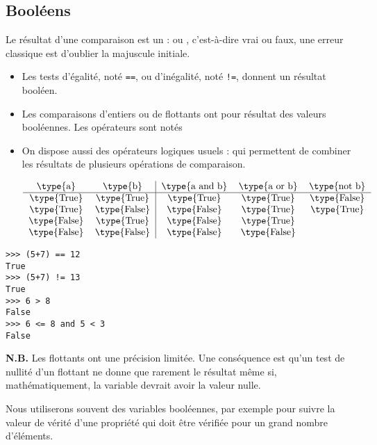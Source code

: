 \subsection{Booléens}
Le résultat d'une comparaison est un  :  ou , c'est-à-dire vrai ou faux, une erreur classique est d'oublier la majuscule initiale.
\begin{itemize}
\item Les tests d'égalité, noté {\tt ==}, ou d'inégalité, noté {\tt !=}, donnent un résultat booléen.
\item Les comparaisons d'entiers ou de flottants ont pour résultat des valeurs booléennes. Les opérateurs sont notés \type{<, >, <=, >=}
\item On dispose aussi des opérateurs logiques usuels :  qui permettent de combiner les résultats de plusieurs opérations de comparaison.

\[\begin{tabular}{cc|ccc}
\type{a} & \type{b} & \type{a and b} & \type{a or b} & \type{not b}\\
\hline
\type{True} & \type{True} & \type{True} & \type{True}  & \type{False} \\
\type{True} & \type{False} & \type{False} &\type{True}  & \type{True}\\
\type{False} & \type{True} & \type{False} &\type{True} \\
\type{False} & \type{False} & \type{False} & \type{False} \\
\end{tabular}\]
\end{itemize}
\begin{lstlisting}
>>> (5+7) == 12   
True
>>> (5+7) != 13 
True
>>> 6 > 8
False
>>> 6 <= 8 and 5 < 3
False
\end{lstlisting}

{\bf N.B.} Les flottants ont une précision limitée. Une conséquence est qu'un test de nullité d'un flottant ne donne que rarement le résultat  même si, mathématiquement, la variable devrait avoir la valeur nulle.

Nous utiliserons souvent des variables booléennes, par exemple pour suivre la valeur de vérité d'une propriété qui doit être vérifiée pour un grand nombre d'éléments.
\newpage
